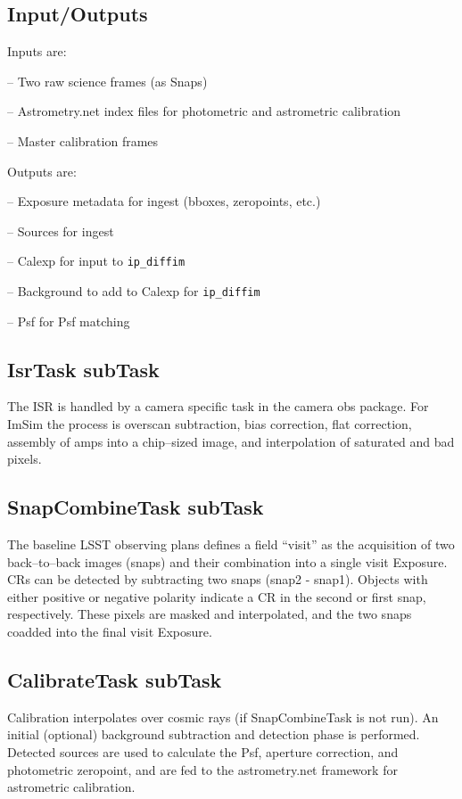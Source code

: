 \documentclass[prd, nofootinbib, floatfix, 11pt,tightenlines,times]{article}
\begin{document}
\subsection{Input/Outputs}
Inputs are:

-- Two raw science frames (as Snaps)

-- Astrometry.net index files for photometric and astrometric calibration

-- Master calibration frames


Outputs are:

-- Exposure metadata for ingest (bboxes, zeropoints, etc.)

-- Sources for ingest

-- Calexp for input to {\tt ip\_diffim}

-- Background to add to Calexp for {\tt ip\_diffim}

-- Psf for Psf matching

\subsection{IsrTask subTask}
The ISR is handled by a camera specific task in the camera obs
package.  For ImSim the process is overscan subtraction, bias
correction, flat correction, assembly of amps into a chip--sized
image, and interpolation of saturated and bad pixels.

\subsection{SnapCombineTask subTask}
The baseline LSST observing plans defines a field ``visit'' as the
acquisition of two back--to--back images (snaps) and their combination
into a single visit Exposure.  CRs can be detected by subtracting two
snaps (snap2 - snap1). Objects with either positive or negative
polarity indicate a CR in the second or first snap, respectively.
These pixels are masked and interpolated, and the two snaps coadded
into the final visit Exposure.


\subsection{CalibrateTask subTask} 
Calibration interpolates over cosmic rays (if
SnapCombineTask is not run).  An initial (optional)
background subtraction and detection phase is performed.  Detected
sources are used to calculate the Psf, aperture correction, and
photometric zeropoint, and are fed to the astrometry.net framework for
astrometric calibration.
\end{document}
